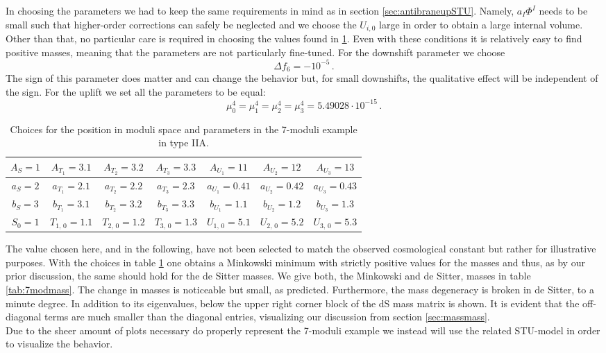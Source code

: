 \documentclass[a4paper,12pt,twoside,openright]{report}
\newcommand{\be}{\begin{equation}}
\newcommand{\ee}{\end{equation}}
\begin{document}
In choosing the parameters we had to keep the same requirements in mind as in section \ref{sec:antibraneupSTU}.  Namely, $a_I \Phi^I$ needs to be small such that higher-order corrections can safely be neglected and we choose the $U_{i,0}$ large in order to obtain a large internal volume. Other than that, no particular care is required in choosing the values found in \ref{tab:7modchoice}. Even with these conditions it is relatively easy to find positive masses, meaning that the parameters are not particularly fine-tuned. For the downshift parameter we choose 
\be 
\Delta f_6 = -10^{-5}\,.
\ee 
The sign of this parameter does matter and can change the behavior but, for small downshifts, the qualitative effect will be independent of the sign. For the uplift we set all the parameters to be equal:
\be 
\mu_0 ^4 = \mu_1 ^4 = \mu_2 ^4 = \mu_3 ^4 = 5.49028 \cdot 10^{-15}\,.
\ee
\begin{table}[H]
\centering
\begin{tabular}{|c|c|c|c|c|c|c|}\hline
$A_S = 1$ & $A_{T_1} = 3.1$& $A_{T_2} = 3.2$& $A_{T_3} = 3.3$ & $A_{U_1} =11$& $A_{U_2} =12$& $A_{U_3} =13$\\\hline
$a_S = 2$ & $a_{T_1} = 2.1$& $a_{T_2} = 2.2$& $a_{T_3} = 2.3$ & $a_{U_1} =0.41$& $a_{U_2} =0.42$& $a_{U_3} =0.43$\\\hline
$b_S = 3$ & $b_{T_1} = 3.1$& $b_{T_2} = 3.2$& $b_{T_3} = 3.3$ & $b_{U_1} =1.1$& $b_{U_2} =1.2$& $b_{U_3} =1.3$\\\hline
$S_0 = 1$ & $T_{1,\,0} = 1.1$  & $T_{2,\,0} = 1.2$  & $T_{3,\,0} = 1.3$ & $U_{1,\,0} = 5.1$& $U_{2,\,0} = 5.2$& $U_{3,\,0} = 5.3$\\\hline
\end{tabular}
\caption{Choices for the position in moduli space and parameters in the 7-moduli example in type IIA.}
\label{tab:7modchoice}
\end{table}
The value chosen here, and in the following, have not been selected to match the observed cosmological constant but rather for illustrative purposes. With the choices in table \ref{tab:7modchoice} one obtains a Minkowski minimum with strictly positive values for the masses and thus, as by our prior discussion, the same should hold for the de Sitter masses. We give both, the Minkowski and de Sitter, masses in table \ref{tab:7modmass}. The change in masses is noticeable but small, as predicted. Furthermore, the mass degeneracy is  broken in de Sitter, to a minute degree. In addition to its eigenvalues, below the upper right corner block of the dS mass matrix is shown. It is evident that the off-diagonal terms are much smaller than the diagonal entries, visualizing our discussion from section \ref{sec:massmass}.\\
Due to the sheer amount of plots necessary do properly represent the 7-moduli example we instead will use the related STU-model in order  to visualize the behavior.
\end{document}
